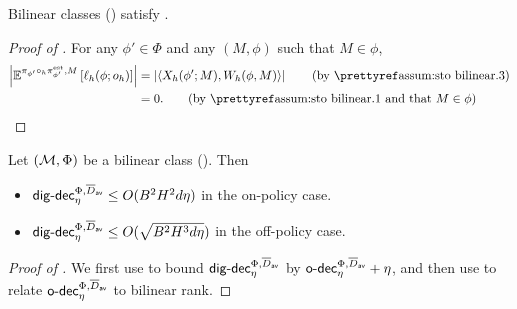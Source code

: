 \begin{lemma}\label{lem: bilinear satisfy M* property}
   Bilinear classes () satisfy . 
\end{lemma}
\begin{proof}[Proof of ]
For any $\phi'\in\Phi$ and any $(M,\phi)$ such that $M\in\phi$, 
\begin{align*}
    \left|\E^{\pi_{\phi'}\circ_h \pi_{\phi'}^{\esttt}, M} \left[  \ellest_h(\phi; o_h) \right] \right| 
    &= \left| \inner{X_h(\phi'; M),  W_h(\phi, M)}\right|   \tag{by \pref{assum:sto bilinear}.3} \\
    &= 0.   \tag{by \pref{assum:sto bilinear}.1 and that $M\in\phi$}
\end{align*}
\end{proof}

\begin{lemma}\label{lem: digdec < d bi}
    Let $(\mathcal{M}, \Phi)$ be a bilinear class (). Then 
    \begin{itemize}[leftmargin=1em, nosep]
 \setlength{\itemsep}{0pt} %
    \setlength{\parskip}{0pt} 
    \setlength{\topsep}{0pt}
    \item $\mathsf{dig}\text{-}\mathsf{dec}_\eta^{\Phi,\overline{D}_{\mathsf{av}}}  \le O(B^2H^2 d\eta)$ in the on-policy case. 
    \item $\mathsf{dig}\text{-}\mathsf{dec}_\eta^{\Phi,\overline{D}_{\mathsf{av}}}  \le O(\sqrt{B^2 H^3 d \eta})$ in the off-policy case.
\end{itemize}
\end{lemma}
\begin{proof}[Proof of ]
    We first use  to bound $\mathsf{dig}\text{-}\mathsf{dec}_\eta^{\Phi, \overline{D}_{\mathsf{av}}}$ by $\mathsf{o}\text{-}\mathsf{dec}_\eta^{\Phi, \overline{D}_{\mathsf{av}}}+\eta$, and then use  to relate $\mathsf{o}\text{-}\mathsf{dec}_\eta^{\Phi, \overline{D}_{\mathsf{av}}}$ to bilinear rank. 
\end{proof}


